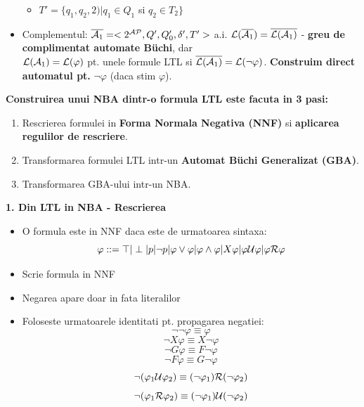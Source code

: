 \documentclass[10pt,a4paper,twocolumn]{report}
\begin{document}
\begin{itemize}
\begin{itemize}
		\item $T' = \{q_1, q_2, 2) | q_1 \in Q_1$ si $q_2 \in T_2\}$
	\end{itemize}
	\item Complementul: $\overline{\mathcal{A}_1} = <2^{\mathcal{AP}}, Q', Q_0', \delta', T'>$ a.i. $\mathcal{L}(\overline{\mathcal{A}_1}) = \overline{\mathcal{L}(\mathcal{A}_1)}$ - \textbf{greu de complimentat automate B\"{u}chi}, dar\\
	$\mathcal{L}(\mathcal{A}_1) = \mathcal{L}(\varphi)$ pt. unele formule LTL si $\overline{\mathcal{L}(\mathcal{A}_1)} = \mathcal{L}(\neg \varphi)$. \textbf{Construim direct automatul pt.} $\neg \varphi$ (daca stim $\varphi$).
\end{itemize}

\textbf{Construirea unui NBA dintr-o formula LTL este facuta in 3 pasi:}
\begin{enumerate}
	\item Rescrierea formulei in \textbf{Forma Normala Negativa (NNF)} si \textbf{aplicarea regulilor de rescriere}.
	\item Transformarea formulei LTL intr-un \textbf{Automat B\"{u}chi Generalizat (GBA)}.
	\item Transformarea GBA-ului intr-un NBA.
\end{enumerate}

\textbf{1. Din LTL in NBA - Rescrierea}
\begin{itemize}
	\item O formula este in NNF daca este de urmatoarea sintaxa:
	\[\varphi ::= \top | \perp | p | \neg p | \varphi \vee \varphi | \varphi \wedge \varphi | X\varphi | \varphi \mathcal{U} \varphi | \varphi \mathcal{R} \varphi\]
	\item Scrie formula in NNF
	\item Negarea apare doar in fata literalilor
	\item Foloseste urmatoarele identitati pt. propagarea negatiei:
	\[\neg\neg\varphi \equiv \varphi\]
	\[\neg X\varphi \equiv X\neg\varphi\]
	\[\neg G\varphi \equiv F\neg\varphi\]
	\[\neg F\varphi \equiv G\neg\varphi\]
	\[\neg (\varphi_1 \mathcal{U} \varphi_2) \equiv (\neg \varphi_1)\mathcal{R}(\neg \varphi_2)\]
	\[\neg (\varphi_1 \mathcal{R} \varphi_2) \equiv (\neg \varphi_1)\mathcal{U}(\neg \varphi_2)\]
\end{itemize}
\end{document}
